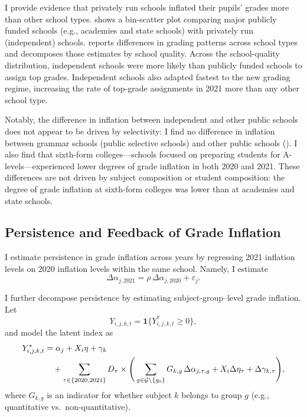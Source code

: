 I provide evidence that privately run schools inflated their pupils’ grades more than other school types.  shows a bin-scatter plot comparing major publicly funded schools (e.g., academies and state schools) with privately run (independent) schools.  reports differences in grading patterns across school types and decomposes those estimates by school quality. Across the school-quality distribution, independent schools were more likely than publicly funded schools to assign top grades. Independent schools also adapted fastest to the new grading regime, increasing the rate of top-grade assignments in 2021 more than any other school type.

Notably, the difference in inflation between independent and other public schools does not appear to be driven by selectivity: I find no difference in inflation between grammar schools (public selective schools) and other public schools (). I also find that sixth-form colleges—schools focused on preparing students for A-levels—experienced lower degrees of grade inflation in both 2020 and 2021. These differences are not driven by subject composition or student composition: the degree of grade inflation at sixth-form colleges was lower than at academies and state schools.

\subsection{Persistence and Feedback of Grade Inflation}

I estimate persistence in grade inflation across years by regressing 2021 inflation levels on 2020 inflation levels within the same school. Namely, I estimate
\begin{equation}
\Delta\alpha_{j,2021} = \rho\,\Delta\alpha_{j,2020} + \varepsilon_j .
\end{equation}

I further decompose persistence by estimating subject-group--level grade inflation. Let
\begin{equation}
Y_{i,j,k,t} = \mathbf{1}\{Y_{i,j,k,t}^* \ge 0\},
\end{equation}
and model the latent index as
\begin{align}
Y_{i,j,k,t}^*
&= \alpha_j + X_i\eta + \gamma_k \notag\\
&\quad + \sum_{\tau\in\{2020,2021\}}
    D_\tau \times\Bigg(
        \sum_{g\in\mathcal{G}\setminus\{g_0\}} 
        G_{k,g}\,\Delta\alpha_{j,\tau,g}
        + X_i\Delta\eta_\tau
        + \Delta\gamma_{k,\tau}
    \Bigg),
\end{align}
where \(G_{k,g}\) is an indicator for whether subject \(k\) belongs to group \(g\) (e.g., quantitative vs.\ non-quantitative).

